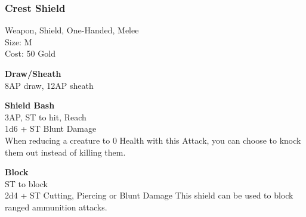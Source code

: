 \subsubsection{Crest Shield}\label{weapon:crestShield}
Weapon, Shield, One-Handed, Melee\\
Size: M\\
Cost: 50 Gold

\textbf{Draw/Sheath}\\
8AP draw, 12AP sheath

\textbf{Shield Bash}\\
3AP, ST to hit,  Reach\\
1d6 + \texttimes ST Blunt Damage\\
When reducing a creature to 0 Health with this Attack, you can choose to knock them out instead of killing them.

\textbf{Block}\\
ST to block\\
2d4 + \texttimes ST Cutting, Piercing or Blunt Damage
This shield can be used to block ranged ammunition attacks.\\

